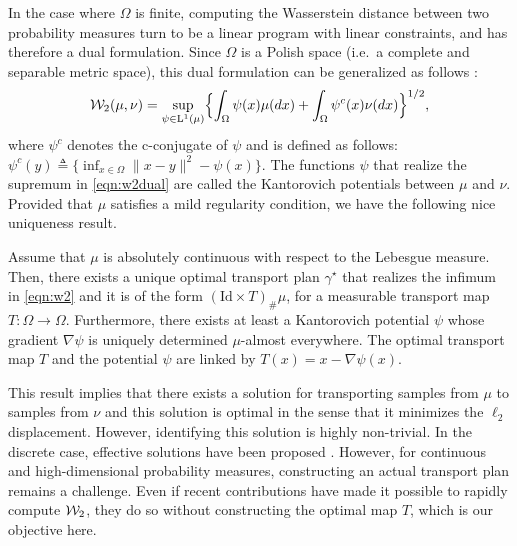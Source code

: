 In the case where $\Omega$ is finite, computing the Wasserstein distance between two probability measures turn to be  a linear program with linear constraints, and has therefore a dual formulation. Since $\Omega$ is a Polish space (i.e.\ a complete and separable metric space), this dual formulation can be generalized as follows \cite[Theorem 5.10]{villani2008optimal}:
\begin{align}
{\cal W}_2(\mu,\nu) = \sup_{\psi \in \mathrm{L}^1(\mu)} \Bigl\{ \int_\Omega \psi(x) \mu(dx) + \int_\Omega \psi^c(x) \nu(dx) \Bigr\}^{1/2}, \label{eqn:w2dual}
\end{align}
where $\psi^c$ denotes the c-conjugate of $\psi$ and is defined as follows: $\psi^c(y) \triangleq \{ \inf_{x\in \Omega} \| x-y\|^2 - \psi(x)\}$. The functions $\psi$ that realize the supremum in \eqref{eqn:w2dual} are called the Kantorovich potentials between $\mu$ and $\nu$.
%
Provided that $\mu$ satisfies a mild regularity condition, we have the following nice uniqueness result.
\begin{thm}
\label{thm:unqmap}
Assume that  $\mu$ is absolutely continuous with respect to the Lebesgue measure. Then, there exists a unique optimal transport plan $\gamma^\star$ that realizes the infimum in \eqref{eqn:w2} and it is of the form $(\text{Id} \times T)_\# \mu$, for a measurable transport map $T : \Omega \to \Omega$. Furthermore, there exists at least a Kantorovich potential $\psi$ whose gradient $\nabla \psi$ is uniquely determined $\mu$-almost everywhere. The optimal transport map $T$ and the potential $\psi$ are linked by $T(x) = x- \nabla \psi(x)$.
\end{thm}


This result implies that there exists a solution for transporting samples from $\mu$ to samples from $\nu$ and this solution is optimal in the sense that it minimizes the $\ell_2$ displacement. However, identifying this solution is highly non-trivial. In the discrete case, effective solutions have been proposed \cite{cuturi2013sinkhorn}. However, for continuous and high-dimensional probability measures, constructing an actual transport plan remains a challenge. Even if recent contributions \cite{genevay2016stochastic} have made it possible to rapidly compute ${\cal W}_2$, they do so without constructing the optimal map $T$, which is our objective here.



